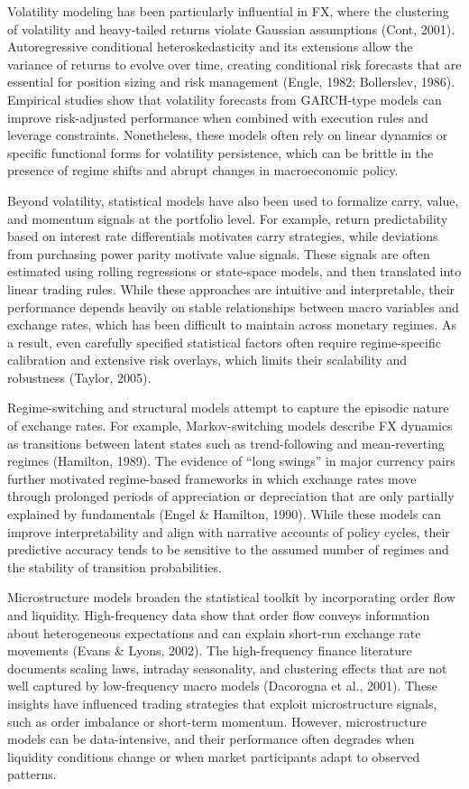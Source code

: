 \documentclass[12pt,a4paper]{article}
\begin{document}
Volatility modeling has been particularly influential in FX, where the clustering of volatility and heavy-tailed returns violate Gaussian assumptions (Cont, 2001). Autoregressive conditional heteroskedasticity and its extensions allow the variance of returns to evolve over time, creating conditional risk forecasts that are essential for position sizing and risk management (Engle, 1982; Bollerslev, 1986). Empirical studies show that volatility forecasts from GARCH-type models can improve risk-adjusted performance when combined with execution rules and leverage constraints. Nonetheless, these models often rely on linear dynamics or specific functional forms for volatility persistence, which can be brittle in the presence of regime shifts and abrupt changes in macroeconomic policy.

Beyond volatility, statistical models have also been used to formalize carry, value, and momentum signals at the portfolio level. For example, return predictability based on interest rate differentials motivates carry strategies, while deviations from purchasing power parity motivate value signals. These signals are often estimated using rolling regressions or state-space models, and then translated into linear trading rules. While these approaches are intuitive and interpretable, their performance depends heavily on stable relationships between macro variables and exchange rates, which has been difficult to maintain across monetary regimes. As a result, even carefully specified statistical factors often require regime-specific calibration and extensive risk overlays, which limits their scalability and robustness (Taylor, 2005).

Regime-switching and structural models attempt to capture the episodic nature of exchange rates. For example, Markov-switching models describe FX dynamics as transitions between latent states such as trend-following and mean-reverting regimes (Hamilton, 1989). The evidence of ``long swings'' in major currency pairs further motivated regime-based frameworks in which exchange rates move through prolonged periods of appreciation or depreciation that are only partially explained by fundamentals (Engel \& Hamilton, 1990). While these models can improve interpretability and align with narrative accounts of policy cycles, their predictive accuracy tends to be sensitive to the assumed number of regimes and the stability of transition probabilities.

Microstructure models broaden the statistical toolkit by incorporating order flow and liquidity. High-frequency data show that order flow conveys information about heterogeneous expectations and can explain short-run exchange rate movements (Evans \& Lyons, 2002). The high-frequency finance literature documents scaling laws, intraday seasonality, and clustering effects that are not well captured by low-frequency macro models (Dacorogna et al., 2001). These insights have influenced trading strategies that exploit microstructure signals, such as order imbalance or short-term momentum. However, microstructure models can be data-intensive, and their performance often degrades when liquidity conditions change or when market participants adapt to observed patterns.
\end{document}
